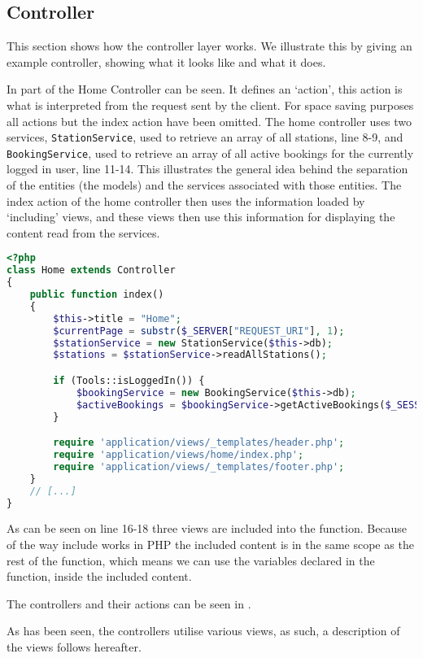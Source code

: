 \subsection{Controller}
This section shows how the controller layer works. 
We illustrate this by giving an example controller, showing what it looks like and what it does.

In  part of the Home Controller can be seen. 
It defines an `action', this action is what is interpreted from the request sent by the client. 
For space saving purposes all actions but the index action have been omitted.
The home controller uses two services, \texttt{StationService}, used to retrieve an array of all stations, line 8-9, and \texttt{BookingService}, used to retrieve an array of all active bookings for the currently logged in user, line 11-14. 
This illustrates the general idea behind the separation of the entities (the models) and the services associated with those entities.
The index action of the home controller then uses the information loaded by `including' views, and these views then use this information for displaying the content read from the services.

\begin{lstlisting}[language=php, label=lst:homeController, caption={Home Controller Class.}]
<?php
class Home extends Controller
{
    public function index()
    {
        $this->title = "Home";
        $currentPage = substr($_SERVER["REQUEST_URI"], 1);
        $stationService = new StationService($this->db);
        $stations = $stationService->readAllStations();

        if (Tools::isLoggedIn()) {
            $bookingService = new BookingService($this->db);
            $activeBookings = $bookingService->getActiveBookings($_SESSION["login_user"]);
        }

        require 'application/views/_templates/header.php';
        require 'application/views/home/index.php';
        require 'application/views/_templates/footer.php';
    }
    // [...]
}
\end{lstlisting}

As can be seen on line 16-18 three views are included into the function. Because of the way include works in PHP the included content is in the same scope as the rest of the function, which means we can use the variables declared in the function, inside the included content.

The controllers and their actions can be seen in .

As has been seen, the controllers utilise various views, as such, a description of the views follows hereafter.